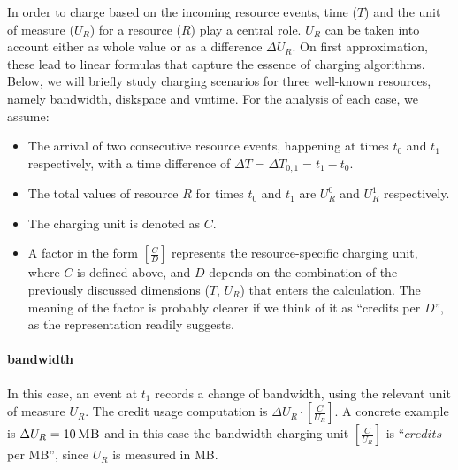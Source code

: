\documentclass[letterpaper,twocolumn,10pt]{article}
\newcommand{\DTime}{\ensuremath{T}\xspace} %
\newcommand{\DUnitR}{\ensuremath{U_{R}}\xspace} %
\newcommand{\DeltaDUnitR}{\ensuremath{\Delta U_{R}}\xspace}
\newcommand{\MB}[1]{\ensuremath{#1\,\mbox{\sc MB}}}
\begin{document}

In order to charge based on the incoming resource events, time (\DTime) and the unit of measure (\DUnitR) for a resource ($R$) play a central role. \DUnitR can be taken into account either as whole value or as a difference \DeltaDUnitR. On first approximation, these lead to linear formulas that capture the essence of charging algorithms. Below, we will briefly  study charging scenarios for three well-known resources, namely \textsf{bandwidth}, \textsf{diskspace} and \textsf{vmtime}. For the analysis of each case, we assume: 
\begin{itemize}
\item The arrival of two consecutive resource events, happening at times $t_0$ and $t_1$ respectively, with a time difference of  $\Delta T = \Delta T_{0, 1} = t_1 - t_0$.

\item The total values of resource $R$ for times $t_0$ and $t_1$ are $U_R^0$ and $U_R^1$ respectively.

\item The charging unit is denoted as $C$. %

\item A factor in the form $[\frac{C}{D}]$ represents the resource-specific charging unit, where $C$ is defined above, and $D$ depends on the combination of the previously discussed dimensions ($T$, $U_R$) that enters the calculation. The meaning of the factor is probably clearer if we think of it as ``credits per $D$'', as the representation readily suggests.
\end{itemize}

\paragraph{\textsf{bandwidth}}
In this case, an event at $t_1$ records a change of bandwidth, using the relevant unit of measure $U_R$.  The credit usage computation is $\Delta U_R \cdot  [ \frac{C}{U_R} ]$.
A concrete example is $\Delta U_R = \MB{10}$ and in this case the bandwidth charging unit $[ \frac{C}{U_R} ]$ is ``$credits$ per {\sc MB}'', since $U_R$ is measured in {\sc MB}.
\end{document}
